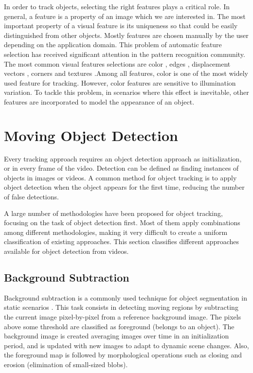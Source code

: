 In order to track objects, selecting the right features plays a critical role.
In general, a \gls{feature} is a property of an image which we are interested in.
The most important property of a visual feature is its uniqueness so
that could be easily distinguished from other objects. Mostly features are
chosen manually by the user depending on the application domain. This problem of
automatic feature selection has received significant attention in the pattern
recognition community. The most common visual features selections are color
\cite{Paschos2001,Song1996}, edges \cite{Canny1986,Bowyer2001}, displacement
vectors \cite{Black1996,Lucas1981a}, corners \cite{Harris1988} and textures
\cite{Haralick1973,Nickels1997,Mallat1989}.Among all features, color is one
of the most widely used feature for
tracking. However, color features are sensitive to illumination variation. To
tackle this problem, in scenarios where this effect is inevitable, other
features are incorporated to model the appearance of an object.

\section{Moving Object Detection} 
\label{sec::detection}

Every tracking approach requires an object detection approach as
initialization, or in every frame of the video. Detection can be defined as
finding instances of objects in images or videos. A common method for object
tracking is to apply object detection when the object appears for the first
time, reducing the number of false detections. 

A large number of methodologies have been proposed for object tracking, focusing
on the task of object detection first. Most of them apply combinations among
different methodologies, making it very difficult to create a uniform
classification of existing approaches. This section classifies
different approaches available for object detection from videos.

\subsection{Background Subtraction}

Background subtraction is a commonly used technique for object segmentation in
static scenarios \cite{McIvor2000}. This task consists in detecting moving
regions by subtracting the current image pixel-by-pixel from a reference
background image. The pixels above some threshold are classified as foreground
(belongs to an object). The background image is created averaging images over
time in an initialization period, and is updated with new images to adapt to
dynamic scene changes. Also, the foreground map is followed by morphological
operations such as closing and erosion (elimination of small-sized blobs).

